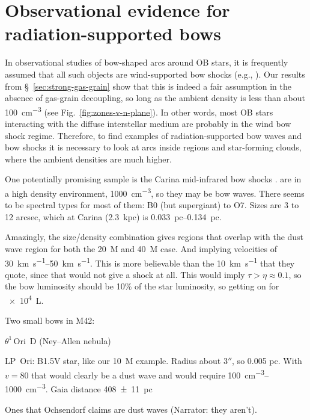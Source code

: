 \section{Observational evidence for radiation-supported bows}
\label{sec:case-studies}

In observational studies of bow-shaped arcs around OB stars, it is
frequently assumed that all such objects are wind-supported bow shocks
(e.g., \citealp{Kobulnicky:2016a}). Our results from
\S~\ref{sec:strong-gas-grain} show that this is indeed a fair
assumption in the absence of gas-grain decoupling, so long as the
ambient density is less than about \SI{100}{cm^{-3}} (see
Fig.~\ref{fig:zones-v-n-plane}). In other words, most OB stars
interacting with the diffuse interstellar medium are probably in the
wind bow shock regime.  Therefore, to find examples of
radiation-supported bow waves and bow shocks it is necessary to look
at arcs inside \hii{} regions and star-forming clouds, where the
ambient densities are much higher.

One potentially promising sample is the Carina mid-infrared bow shocks
\citep{Sexton:2015b}.   are in a high density environment,
\SI{1000}{cm^{-3}}, so they may be bow waves.  There seems to be
spectral types for most of them: B0 (but supergiant) to O7.  Sizes are
3 to 12 arcsec, which at Carina (\SI{2.3}{kpc}) is
\SIrange{0.033}{0.134}{pc}.

Amazingly, the size/density combination gives regions that overlap
with the dust wave region for both the \SI{20}{M_\odot} and \SI{40}{M_\odot}
case.  And implying velocities of \SIrange{30}{50}{km.s^{-1}}.  This
is more believable than the \SI{10}{km.s^{-1}} that they quote, since
that would not give a shock at all.  This would imply
\(\tau > \eta \approx 0.1\), so the bow luminosity should be 10\% of the star
luminosity, so getting on for \SI{e4}{L_\odot}.

Two small bows in M42:

\(\theta^1\)\,Ori~D (Ney--Allen nebula) \citep{Robberto:2005a}

LP~Ori: B1.5V star, like our \SI{10}{M_\odot} example. Radius about
\(3''\), so 0.005 pc.  With \(v = 80\) that would clearly be a dust
wave and would require \SIrange{100}{1000}{cm^{-3}}. Gaia distance \SI{408 +- 11}{pc}


Ones that Ochsendorf claims are dust waves (Narrator: they aren't).


